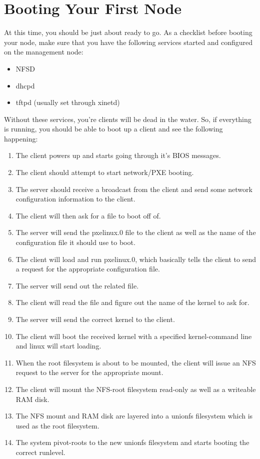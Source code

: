 \documentclass[10pt,a4paper,titlepage]{article}
\begin{document}
\section{Booting Your First Node}
At this time, you should be just about ready to go.  As a checklist before
booting your node, make sure that you have the following services started and
configured on the management node:

\begin{itemize}
\parskip=0pt
\item NFSD
\item dhcpd
\item tftpd (usually set through xinetd)
\end{itemize}

Without these services, you're clients will be dead in the water.  So, if
everything is running, you should be able to boot up a client and see the
following happening:

\begin{enumerate}
\parskip=0pt
\item The client powers up and starts going through it's BIOS messages.
\item The client should attempt to start network/PXE booting.
\item The server should receive a broadcast from the client and send some network configuration information to the client.
\item The client will then ask for a file to boot off of.
\item The server will send the pxelinux.0 file to the client as well as the name of the configuration file it should use to boot.
\item The client will load and run pxelinux.0, which basically tells the client to send a request for the appropriate configuration file.
\item The server will send out the related file.
\item The client will read the file and figure out the name of the kernel to ask for.
\item The server will send the correct kernel to the client.
\item The client will boot the received kernel with a specified kernel-command line and linux will start loading.
\item When the root filesystem is about to be mounted, the client will issue an NFS request to the server for the appropriate mount.
\item The client will mount the NFS-root filesystem read-only as well as a writeable RAM disk.
\item The NFS mount and RAM disk are layered into a unionfs filesystem which is used as the root filesystem.
\item The system pivot-roots to the new unionfs filesystem and starts booting the correct runlevel.
\end{enumerate}
\end{document}
